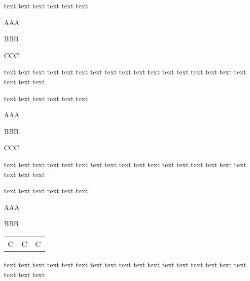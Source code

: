 ﻿\documentclass{article}
\begin{document}
\hrulefill%

    text text text text text text
    \begin{enumerate*}
        \item AAA
        \item BBB
        \item CCC
    \end{enumerate*} 
    text text text text text text text text text text text text text text text text text text text text 

    text text text text text text
    \begin{enumerate*}[before=\unskip{:\ },itemjoin={\ ;\ },itemjoin*={,\ and\ },after={,\ etc.}]
        \item AAA
        \item BBB
        \item CCC
    \end{enumerate*} 
    text text text text text text text text text text text text text text text text text text text text 

    text text text text text text
    \begin{enumerate*}[mode=unboxed,before=\unskip{:\ },itemjoin={\ ;\ },itemjoin*={,\ and\ },after={,\ etc.}]
        \item AAA
        \item BBB
        \item \begin{table}
            \begin{tabular}{ccc}
                \centering
                C&C&C\\
            \end{tabular}
        \end{table}
    \end{enumerate*} 
    text text text text text text text text text text text text text text text text text text text text 
\end{document}
